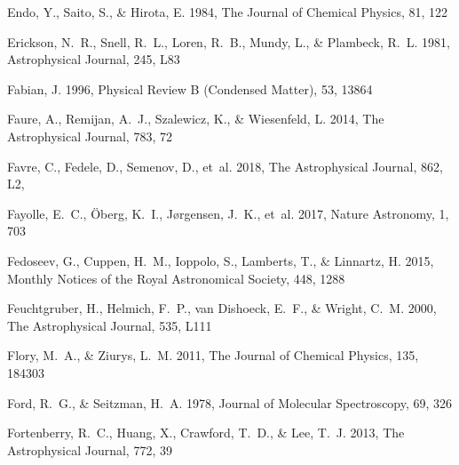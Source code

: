 \documentclass[twocolumn]{aastex631}
\begin{document}
\begin{thebibliography}{}
Endo, Y., Saito, S., \& Hirota, E. 1984, The Journal of Chemical Physics, 81,
  122

Erickson, N.~R., Snell, R.~L., Loren, R.~B., Mundy, L., \& Plambeck, R.~L.
  1981, Astrophysical Journal, 245, L83

Fabian, J. 1996, Physical Review B (Condensed Matter), 53, 13864

Faure, A., Remijan, A.~J., Szalewicz, K., \& Wiesenfeld, L. 2014, The
  Astrophysical Journal, 783, 72

{Favre}, C., {Fedele}, D., {Semenov}, D., {et~al.} 2018, The Astrophysical
  Journal, 862, L2, 

Fayolle, E.~C., {\"O}berg, K.~I., J{\o}rgensen, J.~K., {et~al.} 2017, Nature
  Astronomy, 1, 703

Fedoseev, G., Cuppen, H.~M., Ioppolo, S., Lamberts, T., \& Linnartz, H. 2015,
  Monthly Notices of the Royal Astronomical Society, 448, 1288

Feuchtgruber, H., Helmich, F.~P., van Dishoeck, E.~F., \& Wright, C.~M. 2000,
  The Astrophysical Journal, 535, L111

Flory, M.~A., \& Ziurys, L.~M. 2011, The Journal of Chemical Physics, 135,
  184303

Ford, R.~G., \& Seitzman, H.~A. 1978, Journal of Molecular Spectroscopy, 69,
  326

Fortenberry, R.~C., Huang, X., Crawford, T.~D., \& Lee, T.~J. 2013, The
  Astrophysical Journal, 772, 39


\end{thebibliography}
\end{document}
